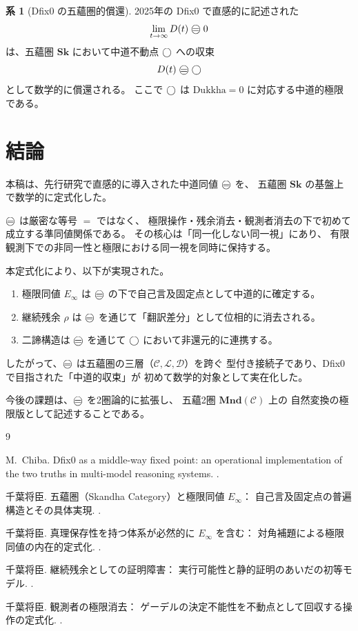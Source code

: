 \documentclass[11pt,a4paper]{article}
\theoremstyle{definition}
\newtheorem{corollary}{系}[section]
\newcommand{\Sk}{\mathbf{Sk}}
\newcommand{\C}{\mathcal{C}}
\newcommand{\Lspace}{\mathcal{L}}
\newcommand{\Dspace}{\mathcal{D}}
\newcommand{\Einfty}{E_{\infty}}
\begin{document}
\begin{corollary}[Dfix0 の五蘊圏的償還]
2025年の Dfix0 で直感的に記述された
\[
\lim_{t\to\infty}D(t)\mweq 0
\]
は、五蘊圏 $\Sk$ において中道不動点 $\bigcirc$ への収束
\[
D(t)\mweq\dfix
\]
として数学的に償還される。
ここで $\bigcirc$ は $\mathrm{Dukkha}=0$ に対応する中道的極限である。
\end{corollary}

\section{結論}

本稿は、先行研究で直感的に導入された中道同値 $\mweq$ を、
五蘊圏 $\Sk$ の基盤上で数学的に定式化した。

$\mweq$ は厳密な等号 $=$ ではなく、
極限操作・残余消去・観測者消去の下で初めて成立する準同値関係である。
その核心は「同一化しない同一視」にあり、
有限観測下での非同一性と極限における同一視を同時に保持する。

本定式化により、以下が実現された。
\begin{enumerate}[label=(\arabic*)]
  \item 極限同値 $\Einfty$ は $\mweq$ の下で自己言及固定点として中道的に確定する。
  \item 継続残余 $\rho$ は $\mweq$ を通じて「翻訳差分」として位相的に消去される。
  \item 二諦構造は $\mweq$ を通じて $\bigcirc$ において非還元的に連携する。
\end{enumerate}

したがって、$\mweq$ は五蘊圏の三層（$\C,\Lspace,\Dspace$）を跨ぐ
型付き接続子であり、Dfix0 で目指された「中道的収束」が
初めて数学的対象として実在化した。

今後の課題は、$\mweq$ を2圏論的に拡張し、
五蘊2圏 $\mathbf{Mnd}(\mathcal{C})$ 上の
自然変換の極限版として記述することである。

\begin{thebibliography}{9}

M.~Chiba.
\newblock Dfix0 as a middle-way fixed point: an operational implementation of
  the two truths in multi-model reasoning systems.
.

千葉将臣.
\newblock 五蘊圏（Skandha Category）と極限同値 $E_\infty$：
  自己言及固定点の普遍構造とその具体実現.
.

千葉将臣.
\newblock 真理保存性を持つ体系が必然的に $E_\infty$ を含む：
  対角補題による極限同値の内在的定式化.
.

千葉将臣.
\newblock 継続残余としての証明障害：
  実行可能性と静的証明のあいだの初等モデル.
.

千葉将臣.
\newblock 観測者の極限消去：
  ゲーデルの決定不能性を不動点として回収する操作の定式化.
.

\end{thebibliography}
\end{document}
